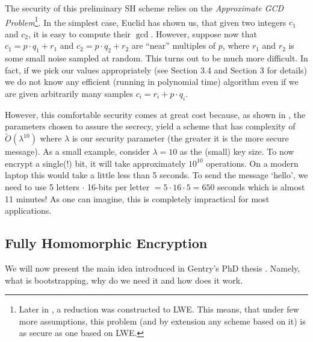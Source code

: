 The security of this preliminary SH scheme relies on the \textit{Approximate GCD Problem}\footnote{Later in \cite{revisited}, a reduction was constructed to LWE. This means, that under few more assumptions, this problem (and by extension any scheme based on it) is as secure as one based on LWE.}. In the simplest case, Euclid has shown us, that given two integers $c_1$ and $c_2$, it is easy to compute their $\gcd$. However, suppose now that $c_1 = p \cdot q_1 + r_1$ and $c_2 = p \cdot q_2 + r_2$ are ``near'' multiples of $p$, where $r_1$ and $r_2$ is some small noise sampled at random. This turns out to be much more difficult. In fact, if we pick our values appropriately (see \cite{easy_fhe} Section 3.4 and \cite{int_scheme} Section 3 for details) we do not know any efficient (running in polynomial time) algorithm even if we are given arbitrarily many samples $c_i = r_i + p \cdot q_i$.

However, this comfortable security comes at great cost because, as shown in \cite{int_scheme}, the parameters chosen to assure the secrecy, yield a scheme that has complexity of $\tilde{O}(\lambda^{10})$ where $\lambda$ is our security parameter (the greater it is the more secure message). As a small example, consider $\lambda = 10$ as the (small) key size. To now encrypt a single(!) bit, it will take approximately $10^{10}$ operations. On a modern laptop this would take a little less than 5 seconds. To send the message `hello', we need to use 5 letters $\cdot$ 16-bits per letter $= 5\cdot 16\cdot5 = 650$ seconds which is almost 11 minutes! As one can imagine, this is completely impractical for most applications.

\subsection{Fully Homomorphic Encryption}
We will now present the main idea introduced in Gentry's PhD thesis \cite{gentry_phd}. Namely, what is bootstrapping, why do we need it and how does it work. %

